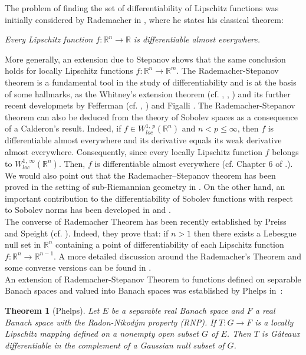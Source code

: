 \documentclass[a4paper,12pt,reqno]{amsart}%
\newtheorem{theorem}{Theorem}
\theoremstyle{definition}
\numberwithin{equation}{section}
\numberwithin{theorem}{section}
\newcommand{\arn}{{\mathbb{R}}^n}
\begin{document}
The problem of finding the  set of differentiability of Lipschitz functions was initially considered by Rademacher in \cite{ra}, where he states his classical theorem: 
\begin{center}
	{\it Every Lipschitz function $f:\mathbb{R}^{n}\rightarrow \mathbb{R}$ is differentiable almost everywhere.}
\end{center}
More generally, an extension due to Stepanov shows that the same conclusion holds for locally Lipschitz functions $f:\mathbb{R}^{n}\rightarrow \mathbb{R}^m$. The Rademacher-Stepanov theorem is a fundamental tool in the study of differentiability and is at the basis of some hallmarks, as the Whitney's extension theorem (cf. \cite{wh1}, \cite{wh2}, \cite{wh3}) and its further recent developmets by Fefferman (cf. \cite{fe1}, \cite{fe2}) and Figalli \cite{fi}. The Rademacher-Stepanov theorem can also be deduced from the theory of Sobolev spaces as a consequence of a Calderon's result. Indeed,  if $f\in W_{loc}^{1,\,p}(\arn)$ and $n< p\leq \infty$, then $f$ is differentiable almost everywhere and its derivative equals its weak derivative almost everywhere. Consequently, since every locally Lipschitz function $f$ belongs to $W_{loc}^{1,\,\infty}(\arn)$. Then,   $f$ is differentiable almost everywhere (cf. Chapter 6 of  \cite{ev}.). We would also point out that the Rademacher–Stepanov theorem has been proved in the setting of sub-Riemannian geometry in \cite{Vodopyav}. On the other hand, an important contribution to the differentiability of Sobolev functions with respect to  Sobolev norms has been developed in \cite{golds} and \cite{Vodopyav1}. \\

The converse of Rademacher Theorem  has been recently established by Preiss and Speight (cf. \cite{ps}). Indeed, they prove that: if $n>1$ then there exists a Lebesgue null set in $\mathbb{R}^{n}$ containing a point of differentiability of each Lipschitz function $f: \mathbb{R}^{n} \rightarrow \mathbb{R}^{n-1}$. A more detailed discussion around the 
Rademacher's Theorem and some converse  versions can be found in \cite{preim4}. \\

An extension of Rademacher-Stepanov Theorem to functions defined on separable Banach spaces and valued into Banach spaces was established by Phelps in~\cite{ph}: 

\begin{theorem}[Phelps]\label{phelps}
	Let $E$ be a separable real Banach space and $F$  a real Banach space with  the 	Radon-Nikod\'{y}m property (RNP). If $T: G \rightarrow F$ is a locally Lipschitz mapping  defined on a nonempty open subset  $G$  of $E$. Then $T$ is G\^ateaux differentiable in the complement of a Gaussian null subset of $G$.	
\end{theorem}
\end{document}
